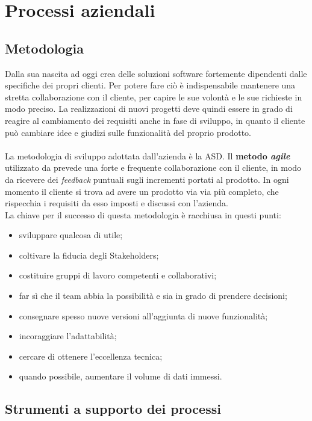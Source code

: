 \section{Processi aziendali}
\subsection{Metodologia}
Dalla sua nascita ad oggi \azienda{} crea delle soluzioni software fortemente dipendenti dalle specifiche dei propri clienti. Per potere fare ciò è indispensabile mantenere una stretta collaborazione con il cliente, per capire le sue volontà e le sue richieste in modo preciso. La realizzazioni di nuovi progetti deve quindi essere in grado di reagire al cambiamento dei requisiti anche in fase di sviluppo, in quanto il cliente può cambiare idee e giudizi sulle funzionalità del proprio prodotto.\\ \\
La metodologia di sviluppo adottata dall'azienda è la \gls{ASD}.
Il \textbf{metodo \emph{agile}} utilizzato da \azienda{} prevede una forte e frequente collaborazione con il cliente, in modo da ricevere dei \emph{feedback} puntuali sugli incrementi portati al prodotto. In ogni momento il cliente si trova ad avere un prodotto via via più completo, che rispecchia i requisiti da esso imposti e discussi con l'azienda.\\
La chiave per il successo di questa metodologia è racchiusa in questi punti:
\begin{itemize}
	\item sviluppare qualcosa di utile;
	\item coltivare la fiducia degli \glspl{Stakeholder};
	\item costituire gruppi di lavoro competenti e collaborativi;
	\item far sì che il team abbia la possibilità e sia in grado di prendere decisioni;
	\item consegnare spesso nuove versioni all'aggiunta di nuove funzionalità;
	\item incoraggiare l'adattabilità;
	\item cercare di ottenere l'eccellenza tecnica;
	\item quando possibile, aumentare il volume di dati immessi.
\end{itemize}

\subsection{Strumenti a supporto dei processi}
\label{Tecnologie}
